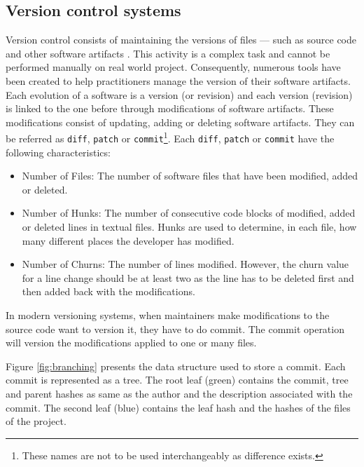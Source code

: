 

\subsection{Version control systems\label{sec:version-control}}

Version control consists of maintaining the versions of files --- such as source code and other software artifacts \cite{Zeller1997}.
This activity is a complex task and cannot be performed manually on real world project.
Consequently, numerous tools have been created to help practitioners manage the version of their software artifacts.
Each evolution of a software is a version (or revision) and each version (revision) is linked to the one before through modifications of software artifacts.
These modifications consist of updating, adding or deleting software artifacts.
They can be referred as \texttt{diff}, {\tt patch} or {\tt commit}\footnote{These names are not to be used interchangeably as difference exists.}.
Each \texttt{diff}, {\tt patch} or {\tt commit} have the following characteristics:

\begin{itemize}
\item Number of Files: The number of software files that have been modified, added or deleted.
\item Number of Hunks: The number of consecutive code blocks of modified, added or deleted lines in textual files. Hunks are used to determine, in each file, how many different places the developer has modified.
\item Number of Churns:  The number of lines modified. However, the churn value for a line change should be at least two as the line has to be deleted first and then added back with the modifications.
\end{itemize}

In modern versioning systems, when maintainers make modifications to the source code want to version it, they have to do commit.
The commit operation will version the modifications applied to one or many files.

Figure \ref{fig:branching} presents the data structure used to store a commit.
Each commit is represented as a tree.
The root leaf (green) contains the commit, tree and parent hashes as same as the author and the description associated with the commit.
The second leaf (blue) contains the leaf hash and the hashes of the files of the project.

